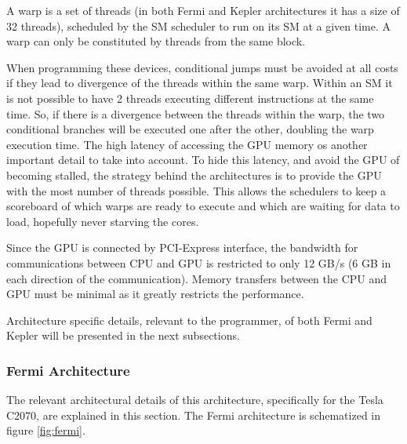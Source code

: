 A warp is a set of \cuda threads (in both Fermi and Kepler architectures it has a size of 32 \cuda threads), scheduled by the SM scheduler to run on its SM at a given time. A warp can only be constituted by \cuda threads from the same block.

When programming these devices, conditional jumps must be avoided at all costs if they lead to divergence of the \cuda threads within the same warp. Within an SM it is not possible to have 2 threads executing different instructions at the same time. So, if there is a divergence between the threads within the warp, the two conditional branches will be executed one after the other, doubling the warp execution time. The high latency of accessing the GPU memory os another important detail to take into account. To hide this latency, and avoid the GPU of becoming stalled, the strategy behind the \nvidia architectures is to provide the GPU with the most number of \cuda threads possible. This allows the schedulers to keep a scoreboard of which warps are ready to execute and which are waiting for data to load, hopefully never starving the \cuda cores.

Since the GPU is connected by PCI-Express interface, the bandwidth for communications between CPU and GPU is restricted to only 12 GB/s (6 GB in each direction of the communication). Memory transfers between the CPU and GPU must be minimal as it greatly restricts the performance.

Architecture specific details, relevant to the programmer, of both Fermi and Kepler will be presented in the next subsections.

\subsubsection{\nvidia Fermi Architecture}

The relevant architectural details of this architecture, specifically for the Tesla C2070, are explained in this section. The Fermi architecture is schematized in figure \ref{fig:fermi}.

